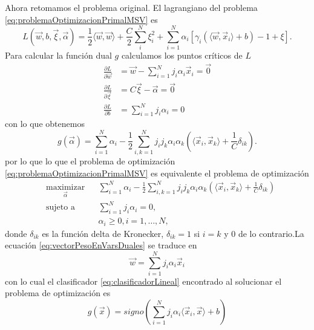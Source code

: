\documentclass[letterpaper,12pt]{book}
\begin{document}
Ahora retomamos el problema original. El lagrangiano del problema \ref{eq:problemaOptimizacionPrimalMSV} es 
\begin{equation}
  L(\vec{w},b,\vec{\xi},\vec{\alpha}) = \frac{1}{2}\langle \vec{w}, \vec{w} \rangle + \frac{C}{2}\sum_{i}^{N}\xi_i^2 + \sum_{i=1}^{N}\alpha_i\left[\gamma_i(\langle \vec{w}, \vec{x}_i \rangle +b) -1 + \xi \right].
\end{equation}
Para calcular la función dual $g$ calculamos los puntos críticos de $L$
\begin{align}
    \frac{\partial L}{\partial\vec{w}} & = \vec{w} - \sum_{i=1}^{N}j_i\alpha_i\vec{x}_i = \vec{0}\label{eq:vectorPesoEnVarsDuales}\\
    \frac{\partial L}{\partial\vec{\xi}} & = C\vec{\xi}-\vec{\alpha} = \vec{0}\\
    \frac{\partial L}{\partial b} & = \sum_{i=1}^{N}j_i\alpha_i = 0
\end{align}
con lo que obtenemos 
\begin{equation}
g(\vec{\alpha}) = \sum_{i=1}^N \alpha_i -\frac{1}{2}\sum_{i,k=1}^Nj_ij_k\alpha_i\alpha_k\left( \langle\vec{x}_i, \vec{x}_k\rangle + \frac{1}{C}\delta_{ik}  \right).
\end{equation}
por lo que lo que el problema de optimización \ref{eq:problemaOptimizacionPrimalMSV} es equivalente el problema de optimización
\begin{equation}\label{eq:problemaOptimizacionDualMSV}
  \begin{aligned}
    & \underset{\vec{\alpha}}{\text{maximizar}}
    & & \sum_{i=1}^N \alpha_i -\frac{1}{2}\sum_{i,k=1}^Nj_ij_k\alpha_i\alpha_k\left( \langle\vec{x}_i, \vec{x}_k\rangle + \frac{1}{C}\delta_{ik}  \right)\\
    & \text{sujeto a}
    & & \sum_{i=1}^Nj_i\alpha_i = 0, \\
    & & & \alpha_i \geq 0, i = 1,\dots,N,
  \end{aligned}
\end{equation}
donde $\delta_{ik}$ es la función delta de Kronecker, $\delta_{ik} = 1$ si $i=k$ y $0$ de lo contrario.La ecuación \ref{eq:vectorPesoEnVarsDuales} se traduce en 
\begin{equation}
\vec{w} = \sum_{i=1}^{N}j_i\alpha_i\vec{x}_i
\end{equation}
con lo cual el clasificador \ref{eq:clasificadorLineal} encontrado al solucionar el problema de optimización es 
\begin{equation}
g(\vec{x}) = signo\left(\sum_{i=1}^{N}j_i\alpha_i\langle\vec{x}_i,\vec{x}\rangle + b \right)
\end{equation}
\end{document}
